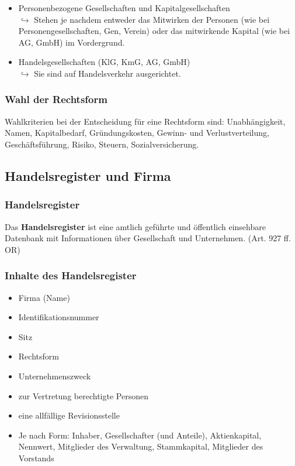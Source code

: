 \documentclass[12pt]{article}
\begin{document}
\begin{itemize}
\begin{figure}[h]
\begin{center}
        \end{center}
    \end{figure}
    \item Personenbezogene Gesellschaften und Kapitalgesellschaften\\
    $\hookrightarrow$ Stehen je nachdem entweder das Mitwirken der Personen (wie bei Personengesellschaften, Gen, Verein) oder das mitwirkende Kapital (wie bei AG, GmbH) im Vordergrund.
    \item Handelsgesellschaften (KlG, KmG, AG, GmbH)\\
    $\hookrightarrow$ Sie sind auf Handelsverkehr ausgerichtet.
\end{itemize}

\subsubsection{Wahl der Rechtsform}
Wahlkriterien bei der Entscheidung für eine Rechtsform sind: Unabhängigkeit, Namen, Kapitalbedarf, Gründungskosten, Gewinn- und Verlustverteilung, Geschäftsführung, Risiko, Steuern, Sozialversicherung.

\subsection{Handelsregister und Firma}
\subsubsection{Handelsregister}
\begin{Definitionsbox}
    Das \textbf{Handelsregister} ist eine amtlich geführte und öffentlich einsehbare Datenbank mit Informationen über Gesellschaft und Unternehmen. (Art. 927 ff. OR)
\end{Definitionsbox}

\subsubsection{Inhalte des Handelsregister}
\begin{itemize}
    \item Firma (Name)
    \item Identifikationsnummer
    \item Sitz
    \item Rechtsform
    \item Unternehmenszweck
    \item zur Vertretung berechtigte Personen
    \item eine allfällige Revisionsstelle
    \item Je nach Form: Inhaber, Gesellschafter (und Anteile), Aktienkapital, Nennwert, Mitglieder des Verwaltung, Stammkapital, Mitglieder des Vorstands
\end{itemize}
\end{document}
